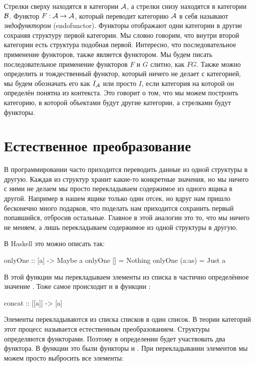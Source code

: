 Стрелки сверху находятся в категории $\mathcal{A}$, а стрелки
снизу находятся в категории $\mathcal{B}$. Функтор $F : \mathcal{A} \rightarrow \mathcal{A}$, 
который переводит категорию $\mathcal{A}$ в себя называют 
\emph{эндофунктором} (endofunctor). Функторы отображают
одни категории в другие сохраняя структуру первой категории. 
Мы словно говорим, что внутри второй категории есть 
структура подобная первой. Интересно, что последовательное
применение функторов, также является функтором. Мы будем
писать последовательное применение функторов $F$ и $G$ 
слитно, как $FG$. Также можно определить
и тождественный функтор, который ничего не делает с категорией,
мы будем обозначать его как $I_{\mathcal{A}}$ или просто $I$, если
категория на которой он определён понятна из контекста.
Это говорит о том, что мы можем построить категорию, в которой
объектами будут другие категории, а стрелками будут функторы.

\section{Естественное преобразование}

В программировании часто приходится переводить данные из 
одной структуры в другую. Каждая из структур хранит какие-то
конкретные значения, но мы ничего с ними не делаем мы просто
перекладываем содержимое из одного ящика в другой. 
Например в нашем ящике только один отсек, но вдруг
нам пришло бесконечно много подарков, что поделать нам
приходится сохранить первый попавшийся, отбросив остальные.
Главное в этой аналогии это то, что мы ничего не меняем, а 
лишь перекладываем содержимое из одной структуры в другую.

В Haskell это можно описать так:

\begin{code}
onlyOne :: [a] -> Maybe a
onlyOne []      = Nothing
onlyOne (a:as)  = Just a
\end{code}

В этой функции мы перекладываем элементы из списка \In{[a]}
в частично определённое значение . 
Тоже самое происходит и в функции :

\begin{code}
concat :: [[a]] -> [a]
\end{code}

Элементы перекладываются из списка списков в один список. 
В теории категорий этот процесс называется естественным
преобразованием. Структуры определяются функторами. 
Поэтому в определении будет участвовать два функтора.
В функции  это были функторы \In{[]} и .
При перекладывании элементов мы можем
просто выбросить все элементы:

